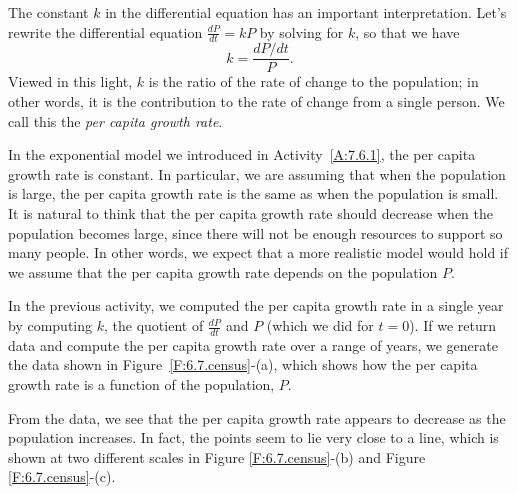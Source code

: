 The constant $k$ in the differential equation has an important
interpretation.  Let's rewrite the differential equation $\frac{dP}{dt} = kP$ by solving for $k$, so that we have
$$k = \frac{dP/dt}{P}.$$
Viewed in this light, $k$ is the ratio of the rate of change to the
population;  in other words, it is the contribution to the rate of change 
from a single person.  We call this the {\em per capita
  growth rate}.

In the exponential model we introduced in Activity~\ref{A:7.6.1}, the per capita growth rate is
constant.  In particular, we are assuming that when the population is
large, the per capita growth rate is the same as when the population
is small.  It is natural to think that the per capita growth rate should
decrease when the population becomes large, since there will not be
enough resources to support so many people.  In other words, we expect that a more realistic model would hold if we assume
that the per capita growth rate depends on the population $P$.

In the previous activity, we computed the per capita growth rate in a
single year by computing $k$, the quotient of $\frac{dP}{dt}$ and $P$ (which we did for $t = 0$).  If we return data and compute the per capita
growth rate over a range of years, we generate the data shown in Figure~\ref{F:6.7.census}-(a), which shows how the per capita growth rate is a function of the population, $P$.  

From the data, we see that the per capita growth rate appears to decrease as
the population increases.  In fact, the points seem to lie very close
to a line, which is shown at two different scales in Figure \ref{F:6.7.census}-(b) and Figure \ref{F:6.7.census}-(c).

